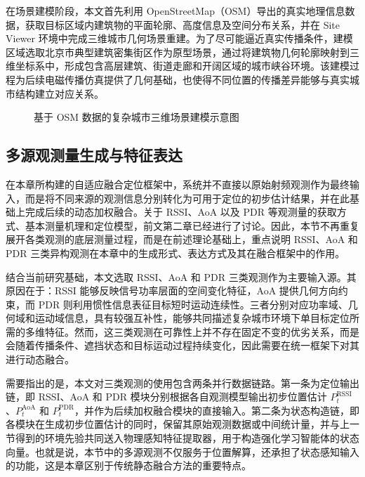在场景建模阶段，本文首先利用 OpenStreetMap（OSM）导出的真实地理信息数据，获取目标区域内建筑物的平面轮廓、高度信息及空间分布关系，并在 Site Viewer 环境中完成三维城市几何场景重建。为了尽可能逼近真实传播条件，建模区域选取北京市典型建筑密集街区作为原型场景，通过将建筑物几何轮廓映射到三维坐标系中，形成包含高层建筑、街道走廊和开阔区域的城市峡谷环境。该建模过程为后续电磁传播仿真提供了几何基础，也使得不同位置的传播差异能够与真实城市结构建立对应关系。

\begin{figure}[htbp]
    \centering
    \vspace{4.2cm}
    \caption{基于 OSM 数据的复杂城市三维场景建模示意图}
    \label{fig:ch3_osm_city_model}
\end{figure}

\subsection{多源观测量生成与特征表达}
\label{subsec:3_2_2}

在本章所构建的自适应融合定位框架中，系统并不直接以原始射频观测作为最终输入，而是将不同来源的观测信息分别转化为可用于定位的初步估计结果，并在此基础上完成后续的动态加权融合。关于 RSSI、AoA 以及 PDR 等观测量的获取方式、基本测量机理和定位模型，前文第二章已经进行了讨论。因此，本节不再重复展开各类观测的底层测量过程，而是在前述理论基础上，重点说明 RSSI、AoA 和 PDR 三类异构观测在本章中的生成形式、表达方式及其在融合框架中的作用。

结合当前研究基础，本文选取 RSSI、AoA 和 PDR 三类观测作为主要输入源。其原因在于：RSSI 能够反映信号功率层面的空间变化特征，AoA 提供几何方向约束，而 PDR 则利用惯性信息表征目标短时运动连续性。三者分别对应功率域、几何域和运动域信息，具有较强互补性，能够共同描述复杂城市环境下单目标定位所需的多维特征。然而，这三类观测在可靠性上并不存在固定不变的优劣关系，而是会随着传播条件、遮挡状态和目标运动过程持续变化，因此需要在统一框架下对其进行动态融合。

需要指出的是，本文对三类观测的使用包含两条并行数据链路。第一条为定位输出链，即 RSSI、AoA 和 PDR 模块分别根据各自观测模型输出初步位置估计 \(P_t^{\mathrm{RSSI}}\)、\(P_t^{\mathrm{AoA}}\) 和 \(P_t^{\mathrm{PDR}}\)，并作为后续加权融合模块的直接输入。第二条为状态构造链，即各模块在生成初步位置估计的同时，保留其原始观测数据或中间统计量，并与上一节得到的环境先验共同送入物理感知特征提取器，用于构造强化学习智能体的状态向量。也就是说，本节中的多源观测不仅服务于位置解算，还承担了状态感知输入的功能，这是本章区别于传统静态融合方法的重要特点。

